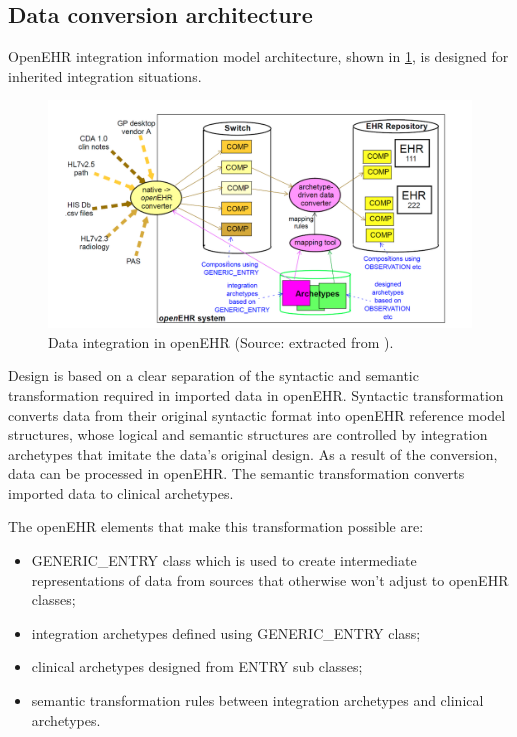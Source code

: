 \subsection{Data conversion architecture}

OpenEHR integration information model architecture, shown in \ref{fig:data_conversion_architecture}, is designed for inherited integration situations.

\begin{figure}[h]
  \centering
  \includegraphics[scale=0.4]{./images/data_conversion_architecture}
  \caption{Data integration in openEHR (Source: extracted from \cite{openEHR}).}
  \label{fig:data_conversion_architecture}
\end{figure}

Design is based on a clear separation of the syntactic and semantic transformation  required in imported data in openEHR. Syntactic transformation converts data from their original syntactic format into openEHR reference model structures, whose logical and semantic structures are controlled by integration archetypes that imitate the data's original design. As a result of the conversion, data can be processed in openEHR. The semantic transformation converts imported data to clinical archetypes.

The openEHR elements that make this transformation possible are:
\begin{itemize}
  \item GENERIC\_ENTRY class which is used to create intermediate representations of data from sources that otherwise won't adjust to openEHR classes;
  \item integration archetypes defined using GENERIC\_EN\-TRY class;
  \item clinical archetypes designed from ENTRY sub classes;
  \item semantic transformation rules between integration archetypes and clinical archetypes.
\end{itemize}
